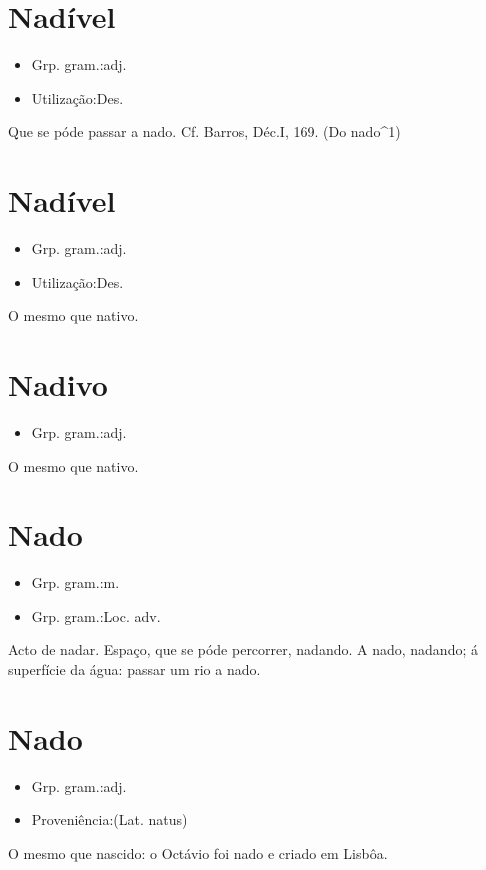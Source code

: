 \section{Nadível}
\begin{itemize}
\item {Grp. gram.:adj.}
\end{itemize}
\begin{itemize}
\item {Utilização:Des.}
\end{itemize}
Que se póde passar a nado. Cf. Barros, \textunderscore Déc.\textunderscore  I, 169.
(Do \textunderscore nado\textunderscore ^1)
\section{Nadível}
\begin{itemize}
\item {Grp. gram.:adj.}
\end{itemize}
\begin{itemize}
\item {Utilização:Des.}
\end{itemize}
O mesmo que \textunderscore nativo\textunderscore .
\section{Nadivo}
\begin{itemize}
\item {Grp. gram.:adj.}
\end{itemize}
O mesmo que \textunderscore nativo\textunderscore .
\section{Nado}
\begin{itemize}
\item {Grp. gram.:m.}
\end{itemize}
\begin{itemize}
\item {Grp. gram.:Loc. adv.}
\end{itemize}
Acto de nadar.
Espaço, que se póde percorrer, nadando.
\textunderscore A nado\textunderscore , nadando; á superfície da água: \textunderscore passar um rio a nado\textunderscore .
\section{Nado}
\begin{itemize}
\item {Grp. gram.:adj.}
\end{itemize}
\begin{itemize}
\item {Proveniência:(Lat. \textunderscore natus\textunderscore )}
\end{itemize}
O mesmo que \textunderscore nascido\textunderscore : \textunderscore o Octávio foi nado e criado em Lisbôa\textunderscore .
